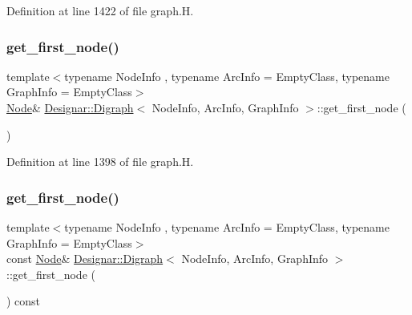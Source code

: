 Definition at line 1422 of file graph.\+H.

\mbox{\label{class_designar_1_1_digraph_a420caa785d93decc7b096de9e51644e7}} 
\subsubsection{\texorpdfstring{get\+\_\+first\+\_\+node()}{get\_first\_node()}\hspace{0.1cm}{\footnotesize\ttfamily [1/2]}}
{\footnotesize\ttfamily template$<$typename Node\+Info , typename Arc\+Info  = Empty\+Class, typename Graph\+Info  = Empty\+Class$>$ \\
\hyperlink{class_designar_1_1_digraph_a4dc921c41a480b7946a04170e997d8ae}{Node}\& \hyperlink{class_designar_1_1_digraph}{Designar\+::\+Digraph}$<$ Node\+Info, Arc\+Info, Graph\+Info $>$\+::get\+\_\+first\+\_\+node (\begin{DoxyParamCaption}{ }\end{DoxyParamCaption})\hspace{0.3cm}{\ttfamily [inline]}}



Definition at line 1398 of file graph.\+H.

\mbox{\label{class_designar_1_1_digraph_ada5266ac3e2ed091a37c434dd7484bb9}} 
\subsubsection{\texorpdfstring{get\+\_\+first\+\_\+node()}{get\_first\_node()}\hspace{0.1cm}{\footnotesize\ttfamily [2/2]}}
{\footnotesize\ttfamily template$<$typename Node\+Info , typename Arc\+Info  = Empty\+Class, typename Graph\+Info  = Empty\+Class$>$ \\
const \hyperlink{class_designar_1_1_digraph_a4dc921c41a480b7946a04170e997d8ae}{Node}\& \hyperlink{class_designar_1_1_digraph}{Designar\+::\+Digraph}$<$ Node\+Info, Arc\+Info, Graph\+Info $>$\+::get\+\_\+first\+\_\+node (\begin{DoxyParamCaption}{ }\end{DoxyParamCaption}) const\hspace{0.3cm}{\ttfamily [inline]}}




